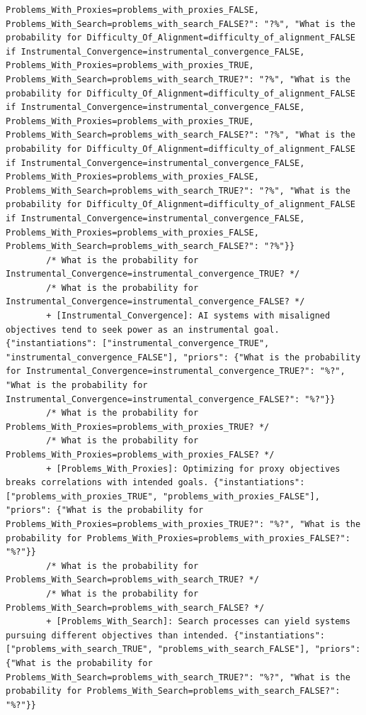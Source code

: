 \documentclass[
  11pt,
  letterpaper,
]{book}
\begin{document}
\begin{verbatim}
Problems_With_Proxies=problems_with_proxies_FALSE, Problems_With_Search=problems_with_search_FALSE?": "?%", "What is the probability for Difficulty_Of_Alignment=difficulty_of_alignment_FALSE if Instrumental_Convergence=instrumental_convergence_FALSE, Problems_With_Proxies=problems_with_proxies_TRUE, Problems_With_Search=problems_with_search_TRUE?": "?%", "What is the probability for Difficulty_Of_Alignment=difficulty_of_alignment_FALSE if Instrumental_Convergence=instrumental_convergence_FALSE, Problems_With_Proxies=problems_with_proxies_TRUE, Problems_With_Search=problems_with_search_FALSE?": "?%", "What is the probability for Difficulty_Of_Alignment=difficulty_of_alignment_FALSE if Instrumental_Convergence=instrumental_convergence_FALSE, Problems_With_Proxies=problems_with_proxies_FALSE, Problems_With_Search=problems_with_search_TRUE?": "?%", "What is the probability for Difficulty_Of_Alignment=difficulty_of_alignment_FALSE if Instrumental_Convergence=instrumental_convergence_FALSE, Problems_With_Proxies=problems_with_proxies_FALSE, Problems_With_Search=problems_with_search_FALSE?": "?%"}}
        /* What is the probability for Instrumental_Convergence=instrumental_convergence_TRUE? */
        /* What is the probability for Instrumental_Convergence=instrumental_convergence_FALSE? */
        + [Instrumental_Convergence]: AI systems with misaligned objectives tend to seek power as an instrumental goal. {"instantiations": ["instrumental_convergence_TRUE", "instrumental_convergence_FALSE"], "priors": {"What is the probability for Instrumental_Convergence=instrumental_convergence_TRUE?": "%?", "What is the probability for Instrumental_Convergence=instrumental_convergence_FALSE?": "%?"}}
        /* What is the probability for Problems_With_Proxies=problems_with_proxies_TRUE? */
        /* What is the probability for Problems_With_Proxies=problems_with_proxies_FALSE? */
        + [Problems_With_Proxies]: Optimizing for proxy objectives breaks correlations with intended goals. {"instantiations": ["problems_with_proxies_TRUE", "problems_with_proxies_FALSE"], "priors": {"What is the probability for Problems_With_Proxies=problems_with_proxies_TRUE?": "%?", "What is the probability for Problems_With_Proxies=problems_with_proxies_FALSE?": "%?"}}
        /* What is the probability for Problems_With_Search=problems_with_search_TRUE? */
        /* What is the probability for Problems_With_Search=problems_with_search_FALSE? */
        + [Problems_With_Search]: Search processes can yield systems pursuing different objectives than intended. {"instantiations": ["problems_with_search_TRUE", "problems_with_search_FALSE"], "priors": {"What is the probability for Problems_With_Search=problems_with_search_TRUE?": "%?", "What is the probability for Problems_With_Search=problems_with_search_FALSE?": "%?"}}

\end{verbatim}
\end{document}
